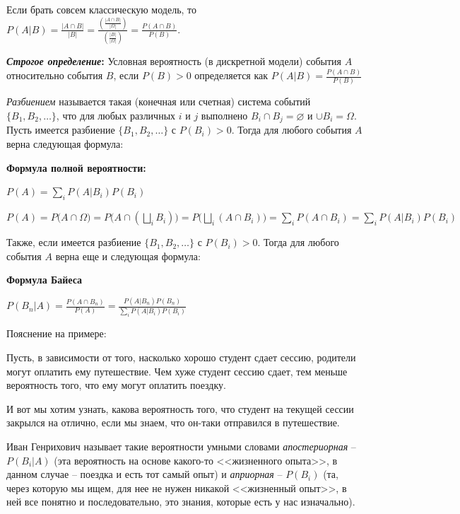 Если брать совсем классическую модель, то $P(A|B) = \frac{|A\cap B|}{|B|} = \frac{(\frac{|A\cap B|}{|\Omega|})}{(\frac{|B|}{|\Omega|})} = \frac{P(A\cap B)}{P(B)}$.

\textbf{\textit{Строгое определение}:}
Условная вероятность (в дискретной модели) события $A$ относительно события $B$, если $P(B) > 0$ определяется как $P(A|B) = \frac{P(A\cap B)}{P(B)}$

\Def \textit{Разбиением} называется такая (конечная или счетная) система событий $\{B_1, B_2, \dots \}$, что для любых различных $i$ и $j$ выполнено $B_i \cap B_j = \varnothing$ и $\cup B_i = \Omega$.\\

Пусть имеется разбиение $\{B_1, B_2, \dots \}$ с $P(B_i) > 0$. Тогда для любого события $A$ верна следующая формула:

\textbf{Формула полной вероятности:}

$P(A) = \sum\limits_{i}P(A|B_i)P(B_i)$

\Proof

$P(A) = P\Big(A \cap \Omega\Big) = P\Big(A \cap (\underset{i}{\bigsqcup} B_i)\Big) =  P\Big(\underset{i}{\bigsqcup} (A \cap B_i)\Big) = \sum\limits_i P(A \cap B_i) = \sum\limits_i P(A|B_i)P(B_i)$

\EndProof

Также, если имеется разбиение $\{B_1, B_2, \dots \}$ с $P(B_i) > 0$. Тогда для любого события $A$ верна еще и следующая формула:

\textbf{Формула Байеса}

$P(B_n|A) = \frac{P(A \cap B_n)}{P(A)} = \frac{P(A|B_n)P(B_n)}{\sum\limits_i P(A|B_i)P(B_i)}$

Пояснение на примере:

Пусть, в зависимости от того, насколько хорошо студент сдает сессию, родители могут оплатить ему путешествие. Чем хуже студент сессию сдает, тем меньше вероятность того, что ему могут оплатить поездку.

И вот мы хотим узнать, какова вероятность того, что студент на текущей сессии закрылся на отлично, если мы знаем, что он-таки отправился в путешествие.\\

\leftbar

Иван Генрихович называет такие вероятности умными словами \textit{апостериорная} -- $P(B_i|A)$ (эта вероятность на основе какого-то <<жизненного опыта>>, в данном случае -- поездка и есть тот самый опыт) и \textit{априорная} -- $P(B_i)$ (та, через которую мы ищем, для нее не нужен никакой <<жизненный опыт>>, в ней все понятно и последовательно, это знания, которые есть у нас изначально).
\endleftbar

